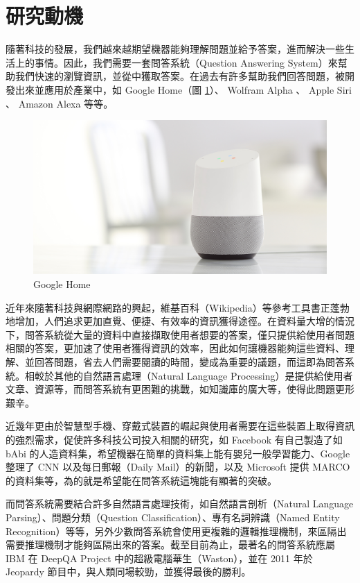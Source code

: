 \section{研究動機}
隨著科技的發展，我們越來越期望機器能夠理解問題並給予答案，進而解決一些生活上的事情。因此，我們需要一套問答系統（Question Answering System）來幫助我們快速的瀏覽資訊，並從中獲取答案。在過去有許多幫助我們回答問題，被開發出來並應用於產業中，如 Google Home（圖 \ref{fig:home_banner}）、 Wolfram Alpha 、 Apple Siri 、 Amazon Alexa 等等。

\begin{figure}
    \centering
    \includegraphics[scale=0.35]{images/home_banner.jpg}
    \caption{Google Home}\label{fig:home_banner}
\end{figure}

近年來隨著科技與網際網路的興起，維基百科（Wikipedia）等參考工具書正蓬勃地增加，人們追求更加直覺、便捷、有效率的資訊獲得途徑。在資料量大增的情況下，問答系統從大量的資料中直接擷取使用者想要的答案，僅只提供給使用者問題相關的答案，更加速了使用者獲得資訊的效率，因此如何讓機器能夠這些資料、理解、並回答問題，省去人們需要閱讀的時間，變成為重要的議題，而這即為問答系統。相較於其他的自然語言處理（Natural Language Processing）是提供給使用者文章、資源等，而問答系統有更困難的挑戰，如知識庫的廣大等，使得此問題更形艱辛。

近幾年更由於智慧型手機、穿戴式裝置的崛起與使用者需要在這些裝置上取得資訊的強烈需求，促使許多科技公司投入相關的研究，如 Facebook 有自己製造了如 bAbi 的人造資料集，希望機器在簡單的資料集上能有嬰兒一般學習能力、Google 整理了 CNN 以及每日郵報（Daily Mail）的新聞，以及 Microsoft 提供 MARCO 的資料集等，為的就是希望能在問答系統這塊能有顯著的突破。

而問答系統需要結合許多自然語言處理技術，如自然語言剖析（Natural Language Parsing）、問題分類（Question Classification）、專有名詞辨識（Named Entity Recognition）等等，另外少數問答系統會使用更複雜的邏輯推理機制，來區隔出需要推理機制才能夠區隔出來的答案。截至目前為止，最著名的問答系統應屬 IBM 在 DeepQA Project 中的超級電腦華生（Waston），並在 2011 年於 Jeopardy 節目中，與人類同場較勁，並獲得最後的勝利。

